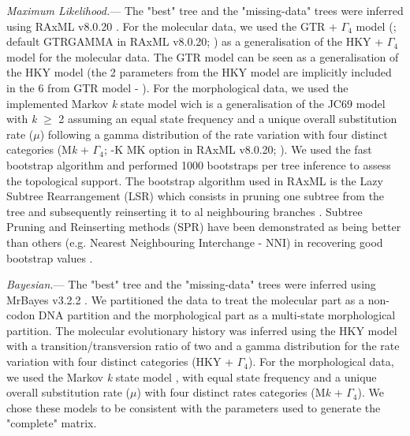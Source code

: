 \documentclass[12pt,letterpaper]{article}
\renewcommand{\subsubsection}[1]{%
\vspace{2ex}
\noindent
\textit{#1.}---}
\begin{document}
\subsubsection{Maximum Likelihood}
The "best" tree and the "missing-data" trees were inferred using RAxML v8.0.20 \citep{Stamatakis21012014}.
For the molecular data, we used the GTR + $\Gamma_4$ model (\citet{tavare1986}; default GTRGAMMA in RAxML v8.0.20; \citet{Stamatakis21012014}) as a generalisation of the HKY + $\Gamma_4$ model \citep{HKY85} for the molecular data.
The GTR model can be seen as a generalisation of the HKY model (the 2 parameters from the HKY model are implicitly included in the 6 from GTR model - \citet{stamatakisa2008}).
For the morphological data, we used the implemented Markov \textit{k} state model \citep{lewisa2001} wich is a generalisation of the JC69 model \citep{jc69} with \textit{k} $\geq$ 2 assuming an equal state frequency and a unique overall substitution rate ($\mu$) following a gamma distribution of the rate variation with four distinct categories (M\textit{k} + $\Gamma_4$; -K MK option in RAxML v8.0.20; \citet{Stamatakis21012014}).
We used the fast bootstrap algorithm and performed 1000 bootstraps per tree inference to assess the topological support. 
The bootstrap algorithm used in RAxML is the Lazy Subtree Rearrangement (LSR) which consists in pruning one subtree from the tree and subsequently reinserting it to al neighbouring branches \citep{stamatakisa2008}.
Subtree Pruning and Reinserting methods (SPR) have been demonstrated as being better than others (e.g. Nearest Neighbouring Interchange - NNI) in recovering good bootstrap values \citep{salamin2003}.

\subsubsection{Bayesian}
The "best" tree and the "missing-data" trees were inferred using MrBayes v3.2.2 \citep{Ronquist2012mrbayes}.
We partitioned the data to treat the molecular part as a non-codon DNA partition and the morphological part as a multi-state morphological partition.
The molecular evolutionary history was inferred using the HKY model with a transition/transversion ratio of two \citep{douadycomparison2003} and a gamma distribution for the rate variation with four distinct categories (HKY + $\Gamma_4$).
For the morphological data, we used the Markov \textit{k} state model \citep{lewisa2001}, with equal state frequency and a unique overall substitution rate ($\mu$) with four distinct rates categories (M\textit{k} + $\Gamma_4$).
We chose these models to be consistent with the parameters used to generate the "complete" matrix.
\end{document}
